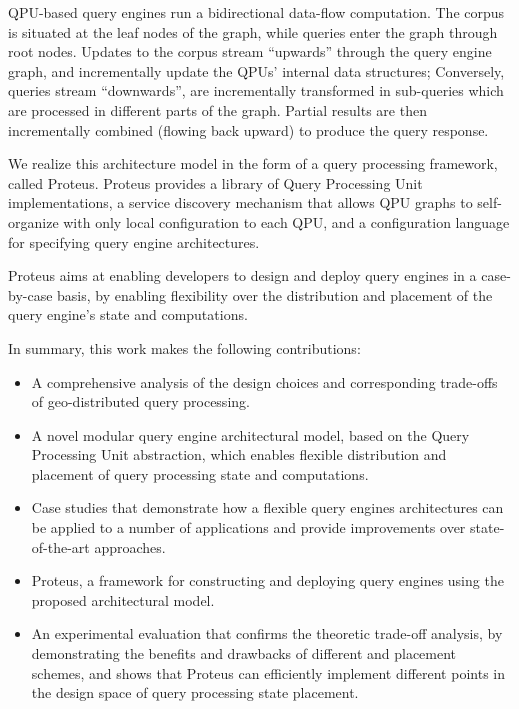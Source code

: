 QPU-based query engines run a bidirectional data-flow computation.
The corpus is situated at the leaf nodes of the graph, while queries enter the graph through root nodes.
Updates to the corpus stream ``upwards'' through the query engine graph, and incrementally update the QPUs’ internal data structures;
Conversely, queries stream ``downwards'', are incrementally transformed in sub-queries which are processed in different parts of the graph.
Partial results are then incrementally combined (flowing back upward) to produce the query response.

\medskip
\noindent
We realize this architecture model in the form of a query processing framework, called Proteus.
Proteus provides a library of Query Processing Unit implementations,
a service discovery mechanism that allows QPU graphs to self-organize with only local configuration to each QPU,
and a configuration language for specifying query engine architectures.

Proteus aims at enabling developers to design and deploy query engines in a case-by-case basis,
by enabling flexibility over the distribution and placement of the query engine's state and computations.


In summary, this work makes the following contributions:

\begin{itemize}
  \item A comprehensive analysis of the design choices and corresponding trade-offs of geo-distributed query processing.

  \item A novel modular query engine architectural model, based on the Query Processing Unit abstraction,
  which enables flexible distribution and placement of query processing state and computations.

  \item Case studies that demonstrate how a flexible query engines architectures can be applied to a number of applications
  and provide improvements over state-of-the-art approaches.

  \item Proteus, a framework for constructing and deploying query engines using the proposed architectural model.

  \item An experimental evaluation that confirms the theoretic trade-off analysis,
  by demonstrating the benefits and drawbacks of different and placement schemes,
  and shows that Proteus can efficiently implement different points in the design space of query processing state placement.
\end{itemize}


